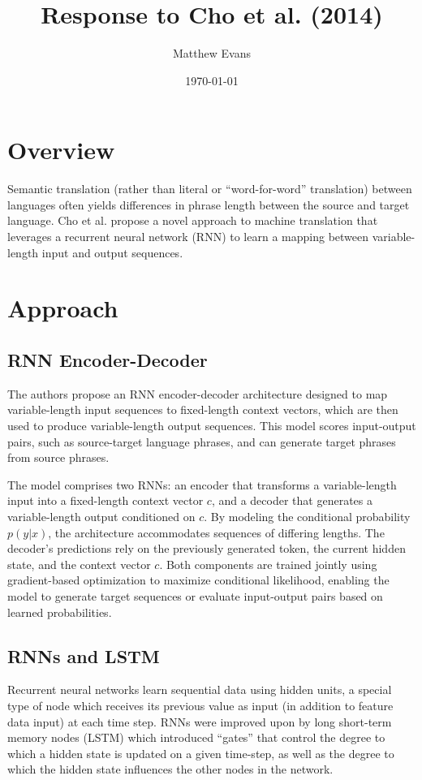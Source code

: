 \documentclass[10pt]{article}
\title{
    Response to Cho et al. (2014) \\
}
\author{Matthew Evans}
\date{\today}
\begin{document}
\maketitle

\section*{Overview}
Semantic translation (rather than literal or ``word-for-word'' translation) between languages often yields differences in phrase length between the source and target language. Cho et al.\cite{cho2014learningphraserepresentationsusing} propose a novel approach to machine translation that leverages a recurrent neural network (RNN) to learn a mapping between variable-length input and output sequences.


\section*{Approach}
\subsection*{RNN Encoder-Decoder}
The authors propose an RNN encoder-decoder architecture designed to map variable-length input sequences to fixed-length context vectors, which are then used to produce variable-length output sequences. This model scores input-output pairs, such as source-target language phrases, and can generate target phrases from source phrases.

The model comprises two RNNs: an encoder that transforms a variable-length input into a fixed-length context vector \(c\), and a decoder that generates a variable-length output conditioned on \(c\). By modeling the conditional probability \(p(y|x)\), the architecture accommodates sequences of differing lengths. The decoder's predictions rely on the previously generated token, the current hidden state, and the context vector \(c\). Both components are trained jointly using gradient-based optimization to maximize conditional likelihood, enabling the model to generate target sequences or evaluate input-output pairs based on learned probabilities.

\subsection*{RNNs and LSTM}
Recurrent neural networks learn sequential data using hidden units, a special type of node which receives its previous value as input (in addition to feature data input) at each time step. RNNs were improved upon by long short-term memory nodes (LSTM)\cite{6795963} which introduced ``gates'' that control the degree to which a hidden state is updated on a given time-step, as well as the degree to which the hidden state influences the other nodes in the network.
\end{document}

